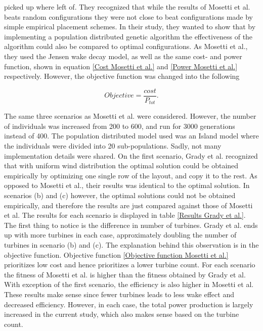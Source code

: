 \noindent \cite{Grady} picked up where \cite{Mosetti} left of. They recognized that while the results of Mosetti et al. beats random configurations they were not close to beat configurations made by simple empirical placement schemes. In their study, they wanted to show that by implementing a population distributed genetic algorithm the effectiveness of the algorithm could also be compared to optimal configurations.	 As Mosetti et al., they used the Jensen wake decay model, as well as the same cost- and power function, shown in equation \ref{Cost Mosetti et al.} and \ref{Power Mosetti et al.} respectively. However, the objective function was changed into the following

\begin{equation}
Objective = \frac{cost}{P_{tot}}.
\label{Objective function Grady et al.}
\end{equation}


\noindent The same three scenarios as Mosetti et al. were considered. However, the number of individuals was increased from 200 to 600, and run for 3000 generations instead of 400. The population distributed model used was an Island model where the individuals were divided into 20 sub-populations. Sadly, not many implementation details were shared. On the first scenario, Grady et al. recognized that with uniform wind distribution the optimal solution could be obtained empirically by optimizing one single row of the layout, and copy it to the rest. As opposed to Mosetti et al., their results was identical to the optimal solution. In scenarios (b) and (c) however, the optimal solutions could not be obtained empirically, and therefore the results are just compared against those of Mosetti et al. The results for each scenario is displayed in table \ref{Results Grady et al.}. The first thing to notice is the difference in number of turbines. Grady et al. ends up with more turbines in each case, approximately doubling the number of turbines in scenario (b) and (c). The explanation behind this observation is in the objective function. Objective function \ref{Objective function Mosetti et al.} prioritizes low cost and hence prioritizes a lower turbine count. For each scenario the fitness of Mosetti et al. is higher than the fitness obtained by Grady et al. With exception of the first scenario, the efficiency is also higher in Mosetti et al. These results make sense since fewer turbines leads to less wake effect and decreased efficiency. However, in each case, the total power production is largely increased in the current study, which also makes sense based on the turbine count. \\


